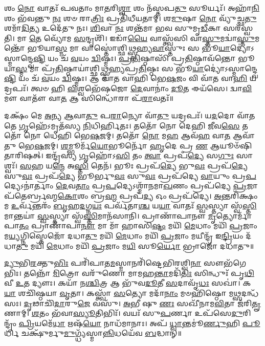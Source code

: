 


𑌶𑌂 \ul{𑌨𑍋} 𑌵𑌾𑌤𑌃᳴ 𑌪𑌵𑌤𑌾𑌂 𑌮𑌾\-\ul{𑌤}\-𑌰𑌿\-\ul{𑌶𑍍𑌵𑌾} 𑌶𑌂 𑌨᳴𑌸𑍍𑌤𑌪\-\ul{𑌤𑍁} 𑌸𑍂𑌰𑍍𑌯𑌃᳴। 𑌅𑌹𑌾᳴\-\ul{𑌨𑌿}\-𑌶𑌂 𑌭᳴𑌵𑌨𑍍𑌤𑍁 \ul{𑌨𑌃} 𑌶𑍞 𑌰𑌾\-\ul{𑌤𑍍𑌰𑌿𑌃} 𑌪𑍍𑌰𑌤𑌿᳴𑌧𑍀𑌯𑌤𑌾𑌮𑍍। 𑌶\-\ul{𑌮𑍁}\-𑌷𑌾 \ul{𑌨𑍋} 𑌵𑍍𑌯𑍁᳴𑌚𑍍𑌛\-\ul{𑌤𑍁} 𑌶𑌮𑌾᳴\-\ul{𑌦𑌿}\-𑌤𑍍𑌯 𑌉𑌦𑍇᳴𑌤𑍁 𑌨𑌃। \ul{𑌶𑌿}\-𑌵𑌾 \ul{𑌨𑌃} 𑌶𑌨𑍍𑌤᳴𑌮𑌾 𑌭𑌵 𑌸𑍁𑌮𑍃\-\ul{𑌡𑍀}\-𑌕𑌾 𑌸𑌰᳴𑌸𑍍𑌵𑌤𑌿। 𑌮𑌾 \ul{𑌤𑍇} 𑌵𑍍𑌯𑍋᳴𑌮 \ul{𑌸}\-𑌨𑍍𑌦𑍃𑌶𑌿᳴। 𑌇𑌡𑌾᳴\-\ul{𑌯𑍈} 𑌵𑌾𑌸𑍍𑌤𑍍𑌵᳴𑌸𑌿 𑌵𑌾\-\ul{𑌸𑍍𑌤𑍁}\-𑌮𑌦𑍍𑌵𑌾॑\-\ul{𑌸𑍍𑌤𑍁}\-𑌮𑌨𑍍𑌤𑍋᳴ 𑌭𑍂𑌯𑌾\-\ul{𑌸𑍍𑌮} 𑌮𑌾 𑌵𑌾𑌸𑍍𑌤𑍋॑𑌶𑍍𑌛𑌿𑌥𑍍𑌸𑍍𑌮𑌹𑍍𑌯\-\ul{𑌵𑌾}\-𑌸𑍍𑌤𑍁𑌃 𑌸 𑌭𑍂᳴\-\ul{𑌯𑌾}\-𑌦𑍍𑌯𑍋॑𑌽𑌸𑍍𑌮𑌾𑌨𑍍𑌦𑍍𑌵𑍇\-\ul{𑌷𑍍𑌟𑌿} 𑌯𑌂 𑌚᳴ \ul{𑌵}\-𑌯𑌂 \ul{𑌦𑍍𑌵𑌿}\-𑌷𑍍𑌮𑌃। \ul{𑌪𑍍𑌰}\-\-\ul{𑌤𑌿}\-𑌷𑍍𑌠𑌾𑌸𑌿᳴ 𑌪𑍍𑌰\-\ul{𑌤𑌿}\-𑌷𑍍𑌠𑌾𑌵᳴𑌨𑍍𑌤𑍋 𑌭𑍂𑌯𑌾\-\ul{𑌸𑍍𑌮} 𑌮𑌾 𑌪𑍍𑌰᳴\-\ul{𑌤𑌿}\-𑌷𑍍𑌠𑌾𑌯𑌾॑𑌶𑍍𑌛𑌿𑌥𑍍𑌸𑍍𑌮𑌹𑍍𑌯𑌪𑍍𑌰\-\ul{𑌤𑌿}\-𑌷𑍍𑌠𑌃 𑌸 𑌭𑍂᳴\-\ul{𑌯𑌾}\-𑌦𑍍𑌯𑍋॑𑌽𑌸𑍍𑌮𑌾𑌨𑍍𑌦𑍍𑌵𑍇\-\ul{𑌷𑍍𑌟𑌿} 𑌯𑌂 𑌚᳴ \ul{𑌵}\-𑌯𑌂 \ul{𑌦𑍍𑌵𑌿}\-𑌷𑍍𑌮𑌃। 𑌆 𑌵𑌾᳴𑌤 𑌵𑌾𑌹𑌿 𑌭𑍇\-\ul{𑌷}\-𑌜𑌂 𑌵𑌿 𑌵𑌾᳴𑌤 𑌵𑌾\-\ul{𑌹𑌿} 𑌯𑌦𑍍𑌰𑌪𑌃᳴। 𑌤𑍍𑌵𑍞 𑌹𑌿 \ul{𑌵𑌿}\-𑌶𑍍𑌵𑌭𑍇᳴𑌷𑌜𑍋 \ul{𑌦𑍇}\-𑌵𑌾𑌨𑌾𑌂॑ \ul{𑌦𑍂}\-𑌤 𑌈𑌯᳴𑌸𑍇। 𑌦𑍍𑌵𑌾\-\ul{𑌵𑌿}\-𑌮𑍗 𑌵𑌾𑌤𑍗᳴ 𑌵𑌾\-\ul{𑌤} 𑌆 𑌸𑌿𑌨𑍍𑌧𑍋᳴𑌰𑌾 𑌪᳴\-\ul{𑌰𑌾}\-𑌵𑌤𑌃᳴॥

𑌦𑌕𑍍𑌷𑌂᳴ 𑌮𑍇 \ul{𑌅}\-𑌨𑍍𑌯 \ul{𑌆}\-𑌵𑌾\-\ul{𑌤𑍁} 𑌪\-\ul{𑌰𑌾}\-𑌨𑍍𑌯𑍋 𑌵𑌾᳴\-\ul{𑌤𑍁} 𑌯𑌦𑍍𑌰𑌪𑌃᳴। 𑌯\-\ul{𑌦}\-𑌦𑍋 𑌵𑌾᳴𑌤𑌤𑍇 \ul{𑌗𑍃}\-𑌹𑍇᳴𑌽𑌮𑍃𑌤᳴𑌸𑍍𑌯 \ul{𑌨𑌿}\-𑌧𑌿𑌰𑍍\mbox{}\-\ul{𑌹𑌿}\-𑌤𑌃। 𑌤𑌤𑍋᳴ 𑌨𑍋 𑌦𑍇𑌹𑌿 \ul{𑌜𑍀}\-𑌵\-\ul{𑌸𑍇} 𑌤𑌤𑍋᳴ 𑌨𑍋 𑌧𑍇𑌹𑌿 𑌭𑍇\-\ul{𑌷}\-𑌜𑌮𑍍। 𑌤𑌤𑍋᳴ \ul{𑌨𑍋} 𑌮\-\ul{𑌹} 𑌆𑌵᳴\-\ul{𑌹} 𑌵𑌾\-\ul{𑌤} 𑌆𑌵𑌾᳴𑌤𑍁 𑌭𑍇\-\ul{𑌷}\-𑌜𑌮𑍍। \ul{𑌶}\-𑌮𑍍𑌭𑍂𑌰𑍍𑌮᳴\-\ul{𑌯𑍋}\-𑌭𑍂𑌰𑍍𑌨𑍋᳴ \ul{𑌹𑍃}\-𑌦𑍇 𑌪𑍍𑌰 \ul{𑌣} 𑌆𑌯𑍂𑍞᳴𑌷𑌿 𑌤𑌾𑌰𑌿𑌷𑌤𑍍। 𑌇𑌨𑍍𑌦𑍍𑌰᳴𑌸𑍍𑌯 \ul{𑌗𑍃}\-𑌹𑍋᳴𑌽\-\ul{𑌸𑌿} 𑌤𑌂 \ul{𑌤𑍍𑌵𑌾} 𑌪𑍍𑌰𑌪᳴\-\ul{𑌦𑍍𑌯𑍇} 𑌸\-\ul{𑌗𑍁𑌃} 𑌸𑌾𑌶𑍍𑌵𑌃᳴। \ul{𑌸}\-𑌹 𑌯\-\ul{𑌨𑍍𑌮𑍇} 𑌅\-\ul{𑌸𑍍𑌤𑌿} 𑌤𑍇𑌨᳴। 𑌭𑍂𑌃 𑌪𑍍𑌰𑌪᳴\-\ul{𑌦𑍍𑌯𑍇} 𑌭𑍁\-\ul{𑌵𑌃} 𑌪𑍍𑌰𑌪᳴\-\ul{𑌦𑍍𑌯𑍇} 𑌸𑍁\-\ul{𑌵𑌃} 𑌪𑍍𑌰𑌪᳴\-\ul{𑌦𑍍𑌯𑍇} 𑌭𑍂𑌰𑍍𑌭𑍁\-\ul{𑌵𑌃} 𑌸𑍁\-\ul{𑌵𑌃} 𑌪𑍍𑌰𑌪᳴𑌦𑍍𑌯𑍇 \ul{𑌵𑌾}\-𑌯𑍁𑌂 𑌪𑍍𑌰\-\ul{𑌪}\-𑌦𑍍𑌯𑍇𑌽𑌨𑌾॑𑌰𑍍𑌤𑌾𑌂 \ul{𑌦𑍇}\-𑌵\-\ul{𑌤𑌾𑌂} 𑌪𑍍𑌰\-\ul{𑌪}\-𑌦𑍍𑌯𑍇𑌽𑌶𑍍𑌮𑌾᳴𑌨𑌮𑌾\-\ul{𑌖}\-𑌣𑌂 𑌪𑍍𑌰𑌪᳴𑌦𑍍𑌯𑍇 \ul{𑌪𑍍𑌰}\-𑌜𑌾𑌪᳴𑌤𑍇𑌰𑍍𑌬𑍍𑌰𑌹𑍍𑌮\-\ul{𑌕𑍋}\-𑌶𑌂 𑌬𑍍𑌰\-\ul{𑌹𑍍𑌮} 𑌪𑍍𑌰𑌪᳴\-\ul{𑌦𑍍𑌯} 𑌓𑌂 𑌪𑍍𑌰𑌪᳴𑌦𑍍𑌯𑍇। \ul{𑌅}\-𑌨𑍍𑌤𑌰𑌿᳴𑌕𑍍𑌷𑌂 𑌮 \ul{𑌉}\-𑌰𑍍𑌵᳴𑌨𑍍𑌤𑌰𑌂᳴ \ul{𑌬𑍃}\-𑌹\-\ul{𑌦}\-𑌗𑍍𑌨\-\ul{𑌯𑌃} 𑌪𑌰𑍍𑌵᳴𑌤𑌾\-\ul{𑌶𑍍𑌚} 𑌯\-\ul{𑌯𑌾} 𑌵𑌾𑌤𑌃᳴ \ul{𑌸𑍍𑌵}\-𑌸𑍍𑌤𑍍𑌯𑌾 𑌸𑍍𑌵᳴\-\ul{𑌸𑍍𑌤𑌿}\-𑌮𑌾𑌨𑍍𑌤𑌯𑌾॑ \ul{𑌸𑍍𑌵}\-𑌸𑍍𑌤𑍍𑌯𑌾 𑌸𑍍𑌵᳴\-\ul{𑌸𑍍𑌤𑌿}\-𑌮𑌾𑌨᳴𑌸𑌾𑌨𑌿। 𑌪𑍍𑌰𑌾𑌣𑌾᳴𑌪𑌾𑌨𑍗 \ul{𑌮𑍃}\-𑌤𑍍𑌯𑍋𑌰𑍍𑌮𑌾᳴ 𑌪𑌾\-\ul{𑌤𑌂} 𑌪𑍍𑌰𑌾𑌣𑌾᳴𑌪𑌾\-\ul{𑌨𑍗} 𑌮𑌾 𑌮𑌾᳴ 𑌹𑌾𑌸𑌿\-\ul{𑌷𑍍𑌟𑌂} 𑌮𑌯𑌿᳴ \ul{𑌮𑍇}\-𑌧𑌾𑌂 𑌮𑌯𑌿᳴ \ul{𑌪𑍍𑌰}\-𑌜𑌾𑌂 𑌮\-\ul{𑌯𑍍𑌯}\-𑌗𑍍𑌨𑌿𑌸𑍍𑌤𑍇𑌜𑍋᳴ 𑌦𑌧𑌾\-\ul{𑌤𑍁} 𑌮𑌯𑌿᳴ \ul{𑌮𑍇}\-𑌧𑌾𑌂 𑌮𑌯𑌿᳴ \ul{𑌪𑍍𑌰}\-𑌜𑌾𑌂 𑌮𑌯𑍀𑌨𑍍𑌦𑍍𑌰᳴ 𑌇\-\ul{𑌨𑍍𑌦𑍍𑌰𑌿}\-𑌯𑌂 𑌦᳴𑌧𑌾\-\ul{𑌤𑍁} 𑌮𑌯𑌿᳴ \ul{𑌮𑍇}\-𑌧𑌾𑌂 𑌮𑌯𑌿᳴ \ul{𑌪𑍍𑌰}\-𑌜𑌾𑌂 𑌮\-\ul{𑌯𑌿} 𑌸𑍂\-\ul{𑌰𑍍𑌯𑍋} 𑌭𑍍𑌰𑌾𑌜𑍋᳴ 𑌦𑌧𑌾𑌤𑍁॥

\-\ul{𑌦𑍍𑌯𑍁}\-𑌭𑌿\-\ul{𑌰}\-𑌕𑍍𑌤𑍁\-\ul{𑌭𑌿𑌃} 𑌪𑌰𑌿᳴𑌪𑌾𑌤\-\ul{𑌮}\-𑌸𑍍𑌮𑌾𑌨𑌰𑌿᳴𑌷𑍍𑌟𑍇𑌭𑌿𑌰𑌶𑍍𑌵𑌿\-\ul{𑌨𑌾} 𑌸𑍗𑌭᳴𑌗𑍇𑌭𑌿𑌃। 𑌤𑌨𑍍𑌨𑍋᳴ \ul{𑌮𑌿}\-𑌤𑍍𑌰𑍋 𑌵𑌰𑍁᳴𑌣𑍋 𑌮𑌾𑌮𑌹\-\ul{𑌨𑍍𑌤𑌾}\-𑌮𑌦𑌿᳴\-\ul{𑌤𑌿𑌃} 𑌸𑌿𑌨𑍍𑌧𑍁𑌃᳴ 𑌪𑍃\-\ul{𑌥𑌿}\-𑌵𑍀 \ul{𑌉}\-𑌤 𑌦𑍍𑌯𑍗𑌃। 𑌕𑌯𑌾᳴ 𑌨\-\ul{𑌶𑍍𑌚𑌿}\-𑌤𑍍𑌰 𑌆 𑌭𑍁᳴𑌵\-\ul{𑌦𑍂}\-𑌤𑍀 \ul{𑌸}\-𑌦𑌾𑌵𑍃᳴\-\ul{𑌧𑌃} 𑌸𑌖𑌾॑। 𑌕\-\ul{𑌯𑌾} 𑌶𑌚𑌿᳴𑌷𑍍𑌠𑌯𑌾 \ul{𑌵𑍃}\-𑌤𑌾। 𑌕𑌸𑍍𑌤𑍍𑌵𑌾᳴ \ul{𑌸}\-𑌤𑍍𑌯𑍋 𑌮𑌦𑌾᳴\-\ul{𑌨𑌾𑌂} 𑌮𑍞𑌹𑌿᳴𑌷𑍍𑌠𑍋 𑌮\-\ul{𑌥𑍍𑌸}\-𑌦𑌨𑍍𑌧᳴𑌸𑌃। \ul{𑌦𑍃}\-𑌢𑌾𑌚𑌿᳴\-\ul{𑌦𑌾}\-𑌰𑍁\-\ul{𑌜𑍇} 𑌵𑌸𑍁᳴। \ul{𑌅}\-𑌭𑍀 𑌷𑍁 \ul{𑌣𑌃} 𑌸𑌖𑍀᳴𑌨𑌾𑌮\-\ul{𑌵𑌿}\-𑌤𑌾 𑌜᳴𑌰𑌿\-\ul{𑌤𑍄}\-𑌣𑌾𑌮𑍍। \ul{𑌶}\-𑌤𑌂 𑌭᳴𑌵𑌾\-\ul{𑌸𑍍𑌯𑍂}\-𑌤𑌿𑌭𑌿𑌃᳴। 𑌵𑌯𑌃᳴ 𑌸𑍁\-\ul{𑌪}\-𑌰𑍍𑌣𑌾 𑌉𑌪᳴𑌸𑍇\-\ul{𑌦𑍁}\-𑌰𑌿𑌨𑍍𑌦𑍍𑌰𑌂᳴ \ul{𑌪𑍍𑌰𑌿}\-𑌯𑌮𑍇᳴\-\ul{𑌧𑌾} 𑌋𑌷᳴\-\ul{𑌯𑍋} 𑌨𑌾𑌧᳴𑌮𑌾𑌨𑌾𑌃। 𑌅𑌪᳴ \ul{𑌧𑍍𑌵𑌾}\-𑌨𑍍𑌤𑌮𑍂॑\-\ul{𑌰𑍍𑌣𑍁}\-𑌹𑌿 \ul{𑌪𑍂}\-𑌰𑍍𑌧𑌿 𑌚𑌕𑍍𑌷𑍁᳴𑌰𑍍𑌮𑍁\-\ul{𑌮𑍁}\-𑌗𑍍𑌧𑍍𑌯᳴𑌸𑍍𑌮𑌾\-\ul{𑌨𑍍𑌨𑌿}\-𑌧𑌯𑍇᳴𑌵 \ul{𑌬}\-𑌦𑍍𑌧𑌾𑌨𑍍॥

